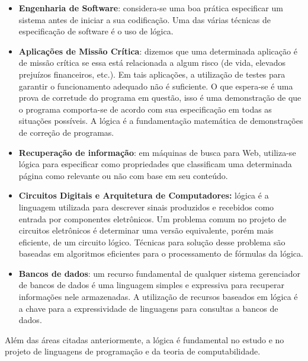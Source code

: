 \begin{itemize}
  \item \textbf{Engenharia de Software}: considera-se uma boa pr\'atica especificar um sistema antes
        de iniciar a sua codifica\c{c}\~ao. Uma das v\'arias t\'ecnicas de especifica\c{c}\~ao de
        software \'e o uso de l\'ogica.
  \item \textbf{Aplica\c{c}\~oes de Miss\~ao Cr\'itica}: dizemos que uma determinada aplica\c{c}\~ao
        \'e de miss\~ao cr\'itica se essa est\'a relacionada a algum risco (de vida, elevados preju\'izos financeiros, etc.).
        Em tais aplica\c{c}\~oes, a utiliza\c{c}\~ao de testes para garantir o funcionamento adequado
        n\~ao \'e suficiente. O que espera-se \'e uma prova de corretude do programa em quest\~ao, isso \'e uma
        demonstra\c{c}\~ao de que o programa comporta-se de acordo com sua especifica\c{c}\~ao em todas as
        situa\c{c}\~oes poss\'iveis. A l\'ogica \'e a fundamenta\c{c}\~ao matem\'atica de demonstra\c{c}\~oes de
        corre\c{c}\~ao de programas.
   \item \textbf{Recupera\c{c}\~ao de informa\c{c}\~ao}: em m\'aquinas de busca para Web, utiliza-se l\'ogica para
         especificar como propriedades que classificam uma determinada p\'agina como relevante ou n\~ao com base
         em seu conte\'udo.
   \item \textbf{Circuitos Digitais e Arquitetura de Computadores:} l\'ogica \'e a linguagem utilizada para descrever
         sinais produzidos e recebidos como entrada por componentes eletr\^onicos. Um problema comum no projeto de
         circuitos eletr\^onicos \'e determinar uma vers\~ao equivalente, por\'em mais eficiente, de um circuito l\'ogico.
         T\'ecnicas para solu\c{c}\~ao desse problema s\~ao baseadas em algoritmos eficientes para o processamento de
         f\'ormulas da l\'ogica.
   \item \textbf{Bancos de dados}: um recurso fundamental de qualquer sistema gerenciador de bancos de dados \'e uma linguagem
         simples e expressiva para recuperar informa\c{c}\~oes nele armazenadas. A utiliza\c{c}\~ao de recursos baseados em
         l\'ogica \'e a chave para a expressividade de linguagens para consultas a bancos de dados.
\end{itemize}

Al\'em das \'areas citadas anteriormente, a l\'ogica \'e fundamental no estudo e no projeto de linguagens de programa\c{c}\~ao
e da teoria de computabilidade.

